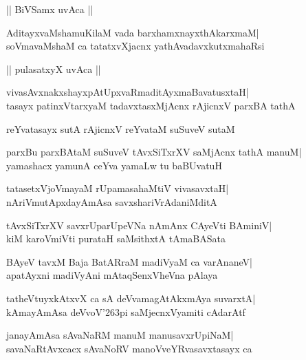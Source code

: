 \documentclass[twoside,12pt,openright]{book}
\def\S{\char'263}
\newcounter{shloka}[chapter]
\begin{document}
\begin{center}
|| BiVSamx uvAca ||
\end{center}
\begin{shloka}%
AditayxvaMshamuKilaM vada barxhamxnayxthAkarxmaM|\\
soVmavaMshaM ca tatatxvXjacnx yathAvadavxkutxmahaRsi
\end{shloka}

\begin{center}
|| pulasatxyX uvAca ||
\end{center}
\begin{shloka}%
vivasAvxnakxshayxpAtUpxvaRmaditAyxmaBavatusxtaH|\\
tasayx patinxVtarxyaM tadavxtasxMjAcnx rAjicnxV parxBA tathA
\end{shloka}

\begin{shloka}%
reYvatasayx sutA rAjicnxV reYvataM suSuveV sutaM
\end{shloka}

\begin{shloka}%
parxBu parxBAtaM suSuveV tAvxSiTxrXV saMjAcnx tathA manuM|\\
yamashacx yamunA ceYva yamaLw tu baBUvatuH
\end{shloka}

\begin{shloka}%
tatasetxVjoVmayaM rUpamasahaMtiV vivasavxtaH|\\
nAriVmutApxdayAmAsa savxshariVrAdaniMditA
\end{shloka}

\begin{shloka}%
tAvxSiTxrXV savxrUparUpeVNa nAmAnx CAyeVti BAminiV|\\
kiM karoVmiVti purataH saMsithxtA tAmaBASata
\end{shloka}

\begin{shloka}%
BAyeV tavxM Baja BatARraM madiVyaM ca varAnaneV|\\
apatAyxni madiVyAni mAtaqSenxVheVna pAlaya
\end{shloka}

\begin{shloka}%
tatheVtuyxkAtxvX ca sA deVvamagAtAkxmAya suvarxtA|\\
kAmayAmAsa deVvoV\S pi saMjecnxVyamiti cAdarAtf
\end{shloka}

\begin{shloka}%
janayAmAsa sAvaNaRM manuM manusavxrUpiNaM|\\
savaNaRtAvxcacx sAvaNoRV manoVveYRvasavxtasayx ca
\end{shloka}
\end{document}
